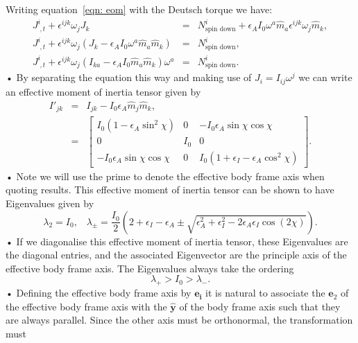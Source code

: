 \documentclass[/home/greg/Thesis/main/main.tex]{subfiles}
\begin{document}
Writing equation~\eqref{eqn: eom} with the Deutsch torque we have:
\begin{eqnarray*}
J^{i}_{\;,t}+\epsilon^{ijk}\omega_{j}J_{k} & = 
& N^{i}_{\textrm{spin down}}+
\epsilon_{A}I_{0}\omega^{a}\hat{m}_{a}\epsilon^{ijk}\omega_{j}\hat{m}_{k}, \\
J^{i}_{\;,t}+
\epsilon^{ijk}\omega_{j}\left(J_{k}-\epsilon_{A}I_{0}\omega^{a}\hat{m}_{a}\hat{m}_{k}\right) 
& = & N^{i}_{\textrm{spin down}}, \\
J^{i}_{\;,t}+
\epsilon^{ijk}\omega_{j}\left(I_{ka}-\epsilon_{A}I_{0}\hat{m}_{a}\hat{m}_{k}\right)\omega^{a} 
& = & N^{i}_{\textrm{spin down}}. 
\end{eqnarray*}•
By separating the equation this way and making use of $J_{i}=I_{ij}\omega^{j}$
we can write an effective moment of inertia tensor given by 
\begin{eqnarray}
I'_{jk}&=&I_{jk}-I_{0}\epsilon_{A}\hat{m}_{j}\hat{m}_{k}, \\
&=& \left[ 
\begin{array}{ccc}
I_{0}(1-\epsilon_{A}\sin^{2}\chi) & 0 & -I_{0}\epsilon_{A}\sin\chi \cos \chi \\  
0 & I_{0} & 0 \\  -I_{0}\epsilon_{A}\sin\chi \cos \chi& 0 &  
I_{0}(1+\epsilon_{I}-\epsilon_{A}\cos^{2}\chi)
\end{array}
\right].
\label{eqn: effective MOI}
\end{eqnarray}•
Note we will use the prime to denote the effective body frame axis when quoting
results. This effective moment of inertia tensor can be shown to have
Eigenvalues given by 
\begin{equation}
\lambda_{2}=I_{0}, \;\;\; \lambda_{\pm}=\frac{I_{0}}{2}\left(2+\epsilon_{I}-\epsilon_{A}\pm \sqrt{\epsilon_{A}^{2}+\epsilon_{I}^{2}-2\epsilon_{A}\epsilon_{I}\cos(2\chi)}\right).
\end{equation}•
If we diagonalise this effective moment of inertia tensor, these Eigenvalues
are the diagonal entries, and the associated Eigenvector are the principle
axis of the effective body frame axis. The Eigenvalues always take the ordering
\begin{equation}
\lambda_{+}>I_{0}>\lambda_{-}.
\end{equation}•
Defining the effective body frame axis by $\boldsymbol{e_{i}}$ it is natural to
associate the $\boldsymbol{e}_{2}$ of the effective body frame axis with the
$\boldsymbol{\hat{y}}$ of the body frame axis such that they are always
parallel. Since the other axis must be orthonormal, the transformation must
\end{document}
